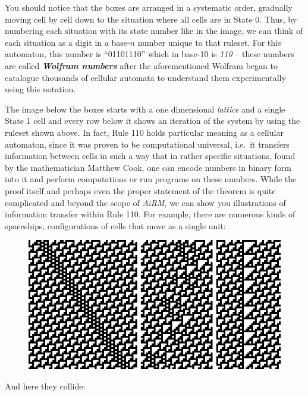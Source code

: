 \documentclass[10pt,a4paper]{article}
\begin{document}
\begin{multicols}{2}
You should notice that the boxes are arranged in a systematic order,
gradually moving cell by cell down to the situation where all cells are
in State 0. Thus, by numbering each situation with its state number like
in the image, we can think of each situation as a digit in a base-\(n\)
number unique to that ruleset. For this automaton, this number is
``01101110'' which in base-10 is \emph{110} -- these numbers are called
\textbf{\emph{Wolfram numbers}} after the aforementioned Wolfram began
to catalogue thousands of cellular automata to understand them
experimentally using this notation.

The image below the boxes starts with a one dimensional \emph{lattice}
and a single State 1 cell and every row below it shows an iteration of
the system by using the ruleset shown above. In fact, Rule 110 holds
particular meaning as a cellular automaton, since it was proven to be
computational universal, i.e.~it transfers information between cells in
such a way that in rather specific situations, found by the
mathematician Matthew Cook, one can encode numbers in binary form into
it and perform computations or run programs on these numbers. While the
proof itself and perhaps even the proper statement of the theorem is
quite complicated and beyond the scope of \emph{AiRM}, we can show you
illustrations of information transfer within Rule 110. For example,
there are numerous kinds of spaceships, configurations of cells that
move as a single unit:

\begin{figure}[htbp]
	\centering
	\includegraphics[width=\linewidth]{image_1.png}
	\caption{}
\end{figure}

And here they collide:


\end{multicols}
\end{document}
